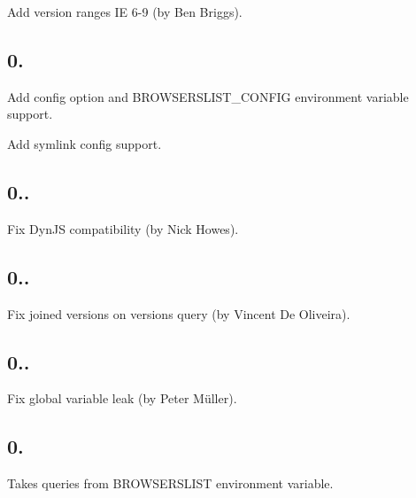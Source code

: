 \begin{DoxyItemize}
\item Add version ranges {\ttfamily IE 6-\/9} (by Ben Briggs).
\end{DoxyItemize}

\subsection*{0.}


\begin{DoxyItemize}
\item Add {\ttfamily config} option and {\ttfamily B\+R\+O\+W\+S\+E\+R\+S\+L\+I\+S\+T\+\_\+\+C\+O\+N\+F\+IG} environment variable support.
\item Add symlink config support.
\end{DoxyItemize}

\subsection*{0..}


\begin{DoxyItemize}
\item Fix Dyn\+JS compatibility (by Nick Howes).
\end{DoxyItemize}

\subsection*{0..}


\begin{DoxyItemize}
\item Fix joined versions on versions query (by Vincent De Oliveira).
\end{DoxyItemize}

\subsection*{0..}


\begin{DoxyItemize}
\item Fix global variable leak (by Peter Müller).
\end{DoxyItemize}

\subsection*{0.}


\begin{DoxyItemize}
\item Takes queries from {\ttfamily B\+R\+O\+W\+S\+E\+R\+S\+L\+I\+ST} environment variable.
\end{DoxyItemize}

